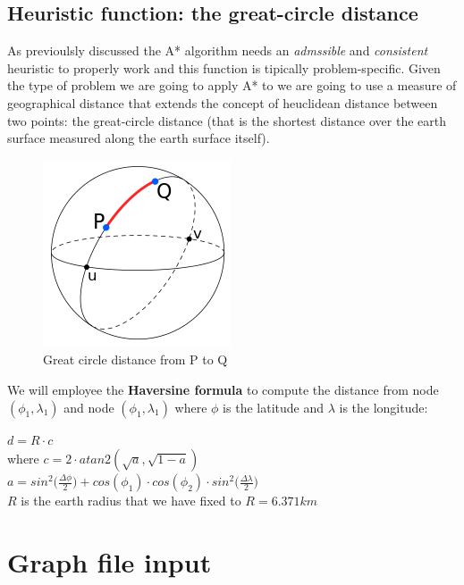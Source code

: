 \documentclass[twocolumn, switch]{article} %
\begin{document}
\subsection{Heuristic function: the great-circle distance}
As previoulsly discussed the A* algorithm needs an \textit{admssible} and \textit{consistent} heuristic to properly work and this
function is tipically problem-specific. Given the type of problem we are going to apply A* to we are going
to use a measure of geographical distance that extends the concept of heuclidean distance between two points:
the great-circle distance (that is the shortest distance over the earth surface measured along the
earth surface itself).
\begin{figure}[ht!]
  \centering
  \includegraphics[width=0.5\linewidth]{others/haversine.png}
  \caption{Great circle distance from P to Q}
  \label{haversine}
\end{figure}
We will employee the \textbf{Haversine formula} to compute the distance from node $(\phi_1,\lambda_1)$
and node $(\phi_1,\lambda_1)$ where $\phi$ is the latitude and $\lambda$ is the longitude:
\begin{center}
  $d = R \cdot c$\\
  where $c = 2 \cdot atan2(\sqrt{a},\sqrt{1-a})$\\
  $a = sin^2\Big({\frac{\Delta \phi}{2}}\Big) + cos(\phi_1) \cdot cos(\phi_2) \cdot sin^2\Big({\frac{\Delta \lambda}{2}}\Big)$
  \\$R$ is the earth radius that we have fixed to $R=6.371km$
\end{center}

\section{Graph file input}
\end{document}
